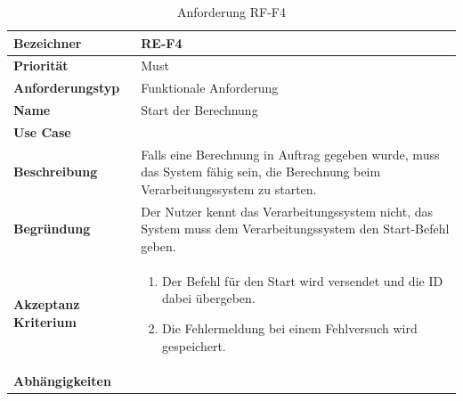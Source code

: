 \begin{table}[ht]
\centering
  \begin{tabular}{ l | p{8cm} }
	\hline
	\rowcolor{gray}
	\textbf{Bezeichner}&	\textbf{RE-F4}\\ \hline
	\textbf{Priorität} 		&	Must\\ \hline
	\textbf{Anforderungstyp}	&	Funktionale Anforderung\\ \hline
	\textbf{Name} 			&	Start der Berechnung\\ \hline
	\textbf{Use Case} 		&	\nameref{table:use_case_2}\\ \hline
	\textbf{Beschreibung} 	&	Falls eine Berechnung in Auftrag gegeben wurde, muss das System fähig sein, die Berechnung beim Verarbeitungssystem zu starten.\\ \hline
	\textbf{Begründung} 		&	Der Nutzer kennt das Verarbeitungssystem nicht, das System muss dem Verarbeitungssystem den Start-Befehl geben.\\ \hline
	\textbf{Akzeptanz Kriterium}	&	\begin{enumerate}
					\item Der Befehl für den Start wird versendet und die ID dabei übergeben.
					\item Die Fehlermeldung bei einem Fehlversuch wird gespeichert.
					\end{enumerate}
					\\ \hline
	\textbf{Abhängigkeiten} 	&	\nameref{table:req_3}\\ \hline
  \end{tabular}
   \caption{Anforderung RF-F4}\label{table:req_4}
\end{table}

